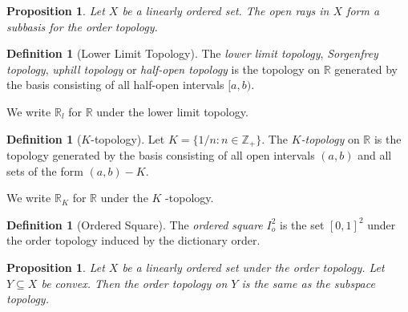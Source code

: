 \documentclass{book}
\newtheorem{prop}[ax]{Proposition}
\theoremstyle{definition}
\newtheorem{df}[ax]{Definition}
\begin{document}
\begin{prop}
Let $X$ be a linearly ordered set. The open rays in $X$ form a subbasis for the order topology.
\end{prop}

\begin{df}[Lower Limit Topology]
The \emph{lower limit topology}, \emph{Sorgenfrey topology}, \emph{uphill topology} or \emph{half-open topology} is the topology on $\mathbb{R}$ generated by the basis consisting of all half-open intervals $[a,b)$.

We write $\mathbb{R}_l$ for $\mathbb{R}$ under the lower limit topology.
\end{df}

\begin{df}[$K$-topology]
Let $K = \{ 1/n : n \in \mathbb{Z}_+ \}$. The \emph{$K$-topology} on $\mathbb{R}$ is the topology generated by the basis consisting of all open intervals $(a,b)$ and all sets of the form $(a,b) - K$.

We write $\mathbb{R}_K$ for $\mathbb{R}$ under the $K$ -topology.
\end{df}

\begin{df}[Ordered Square]
The \emph{ordered square} $I_o^2$ is the set $[0,1]^2$ under the order topology induced by the dictionary order.
\end{df}

\begin{prop}
Let $X$ be a linearly ordered set under the order topology. Let $Y \subseteq X$ be convex. Then the order topology on $Y$ is the same as the subspace topology.
\end{prop}
\end{document}
